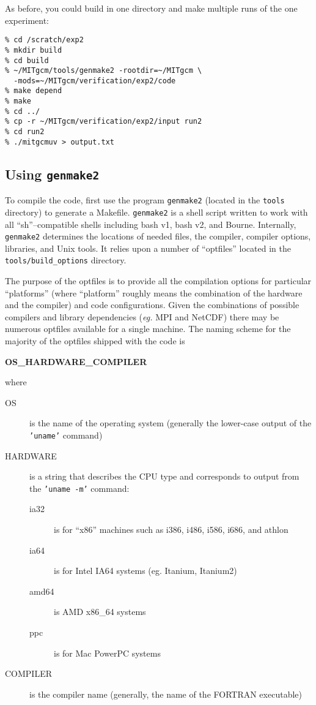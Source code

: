 As before, you could build in one directory and make multiple runs of
the one experiment:
\begin{verbatim}
% cd /scratch/exp2
% mkdir build
% cd build
% ~/MITgcm/tools/genmake2 -rootdir=~/MITgcm \
  -mods=~/MITgcm/verification/exp2/code
% make depend
% make
% cd ../
% cp -r ~/MITgcm/verification/exp2/input run2
% cd run2
% ./mitgcmuv > output.txt
\end{verbatim}


\subsection{Using \texttt{genmake2}}
\label{sect:genmake}

To compile the code, first use the program \texttt{genmake2} (located
in the \texttt{tools} directory) to generate a Makefile.
\texttt{genmake2} is a shell script written to work with all
``sh''--compatible shells including bash v1, bash v2, and Bourne.
Internally, \texttt{genmake2} determines the locations of needed
files, the compiler, compiler options, libraries, and Unix tools.  It
relies upon a number of ``optfiles'' located in the
\texttt{tools/build\_options} directory.

The purpose of the optfiles is to provide all the compilation options
for particular ``platforms'' (where ``platform'' roughly means the
combination of the hardware and the compiler) and code configurations.
Given the combinations of possible compilers and library dependencies
({\it eg.}  MPI and NetCDF) there may be numerous optfiles available
for a single machine.  The naming scheme for the majority of the
optfiles shipped with the code is
\begin{center}
  {\bf OS\_HARDWARE\_COMPILER }
\end{center}
where
\begin{description}
\item[OS] is the name of the operating system (generally the
  lower-case output of the {\tt 'uname'} command)
\item[HARDWARE] is a string that describes the CPU type and
  corresponds to output from the  {\tt 'uname -m'} command:
  \begin{description}
  \item[ia32] is for ``x86'' machines such as i386, i486, i586, i686,
    and athlon
  \item[ia64] is for Intel IA64 systems (eg. Itanium, Itanium2)
  \item[amd64] is AMD x86\_64 systems
  \item[ppc] is for Mac PowerPC systems
  \end{description}
\item[COMPILER] is the compiler name (generally, the name of the
  FORTRAN executable)
\end{description}

